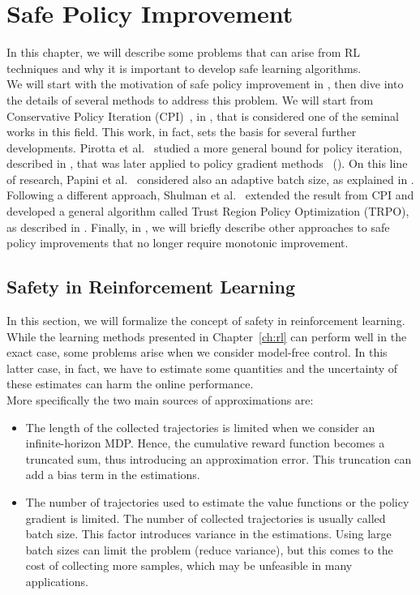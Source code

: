\chapter{Safe Policy Improvement}
\label{ch:safepg}

In this chapter, we will describe some problems that can arise from RL techniques and why it is important to develop safe learning algorithms. \\
We will start with the motivation of safe policy improvement in , then dive into the details of several methods to address this problem. We will start from Conservative Policy Iteration (CPI)~\cite{Kakade02approximatelyoptimal}, in , that is considered one of the seminal works in this field. This work, in fact, sets the basis for several further developments. Pirotta et al.~\cite{safe_iteration} studied a more general bound for policy iteration, described in , that was later applied to policy gradient methods~\cite{adaptive_step} (). On this line of research, Papini et al.~\cite{adaptive_batch} considered also an adaptive batch size, as explained in . Following a different approach, Shulman et al.~\cite{trpo} extended the result from CPI and developed a general algorithm called Trust Region Policy Optimization (TRPO), as described in . Finally, in , we will briefly describe other approaches to safe policy improvements that no longer require monotonic improvement.

\section{Safety in Reinforcement Learning}
\label{sec:whysafety}
In this section, we will formalize the concept of safety in reinforcement learning. While the learning methods presented in Chapter~\ref{ch:rl} can perform well in the exact case, some problems arise when we consider model-free control. In this latter case, in fact, we have to estimate some quantities and the uncertainty of these estimates can harm the online performance. \\
More specifically the two main sources of approximations are: 
\begin{itemize}
\item The length of the collected trajectories is limited when we consider an infinite-horizon MDP. Hence, the cumulative reward function becomes a truncated sum, thus introducing an approximation error. This truncation can add a bias term in the estimations. 
\item The number of trajectories used to estimate the value functions or the policy gradient is limited. The number of collected trajectories is usually called batch size. This factor introduces variance in the estimations. Using large batch sizes can limit the problem (reduce variance), but this comes to the cost of collecting more samples, which may be unfeasible in many applications.
\end{itemize}

